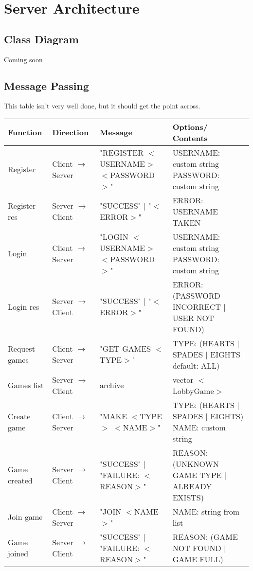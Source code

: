\section{Server Architecture}
\subsection{Class Diagram}
Coming soon
\subsection{Message Passing}
This table isn't very well done, but it should get the point across.
\begin{center}
\begin{longtable}{|m{8em}|m{7em}|m{12em}|m{6em}|}
\hline
Function & Direction & Message & Options/ Contents \\
\hline\hline
Register & Client $\rightarrow$ Server & "REGISTER $<$USERNAME$>$ $<$PASSWORD$>$" & USERNAME: custom string PASSWORD: custom string\\
\hline
Register res & Server $\rightarrow$ Client & "SUCCESS" $|$ "$<$ERROR$>$" & ERROR: USERNAME TAKEN\\
\hline
Login & Client $\rightarrow$ Server & "LOGIN $<$USERNAME$>$ $<$PASSWORD$>$" & USERNAME: custom string PASSWORD: custom string\\
\hline
Login res & Server $\rightarrow$ Client & "SUCCESS" $|$ "$<$ERROR$>$" & ERROR: (PASSWORD INCORRECT $|$ USER NOT FOUND)\\
\hline
Request games & Client $\rightarrow$ Server & "GET GAMES $<$TYPE$>$" & TYPE: (HEARTS $|$ SPADES $|$ EIGHTS $|$ default: ALL)\\
\hline
Games list & Server $\rightarrow$ Client & archive & vector $<$LobbyGame$>$\\
\hline
Create game & Client $\rightarrow$ Server & "MAKE $<$TYPE$>$ $<$NAME$>$" & TYPE: (HEARTS $|$ SPADES $|$ EIGHTS) NAME: custom string\\
\hline
Game created & Server $\rightarrow$ Client & "SUCCESS" $|$ "FAILURE: $<$REASON$>$" & REASON: (UNKNOWN GAME TYPE $|$ ALREADY EXISTS)\\
\hline
Join game & Client $\rightarrow$ Server & "JOIN $<$NAME$>$" & NAME: string from list\\
\hline
Game joined & Server $\rightarrow$ Client & "SUCCESS" $|$ "FAILURE: $<$REASON$>$" & REASON: (GAME NOT FOUND $|$ GAME FULL)\\
\hline
\end{longtable}
\end{center}
